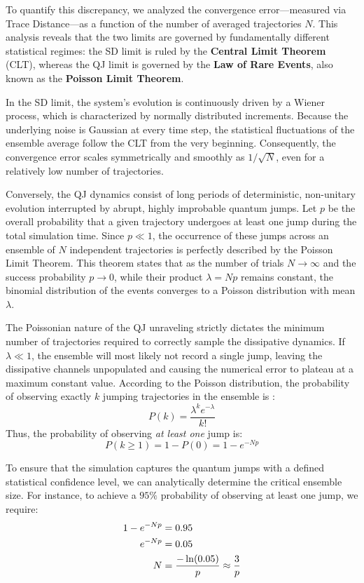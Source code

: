 \documentclass[a4paper,12pt]{article}
\begin{document}
To quantify this discrepancy, we analyzed the convergence error—measured via Trace Distance—as a function of the number of averaged trajectories $N$. This analysis reveals that the two limits are governed by fundamentally different statistical regimes: the SD limit is ruled by the \textbf{Central Limit Theorem} (CLT), whereas the QJ limit is governed by the \textbf{Law of Rare Events}, also known as the \textbf{Poisson Limit Theorem}.

In the SD limit, the system's evolution is continuously driven by a Wiener process, which is characterized by normally distributed increments. Because the underlying noise is Gaussian at every time step, the statistical fluctuations of the ensemble average follow the CLT from the very beginning. Consequently, the convergence error scales symmetrically and smoothly as $1/\sqrt{N}$, even for a relatively low number of trajectories.

Conversely, the QJ dynamics consist of long periods of deterministic, non-unitary evolution interrupted by abrupt, highly improbable quantum jumps. Let $p$ be the overall probability that a given trajectory undergoes at least one jump during the total simulation time. Since $p \ll 1$, the occurrence of these jumps across an ensemble of $N$ independent trajectories is perfectly described by the Poisson Limit Theorem. This theorem states that as the number of trials $N \to \infty$ and the success probability $p \to 0$, while their product $\lambda = Np$ remains constant, the binomial distribution of the events converges to a Poisson distribution with mean $\lambda$.

The Poissonian nature of the QJ unraveling strictly dictates the minimum number of trajectories required to correctly sample the dissipative dynamics. If $\lambda \ll 1$, the ensemble will most likely not record a single jump, leaving the dissipative channels unpopulated and causing the numerical error to plateau at a maximum constant value. According to the Poisson distribution, the probability of observing exactly $k$ jumping trajectories in the ensemble is :
\begin{equation}
	P(k) = \frac{\lambda^k e^{-\lambda}}{k!}
\end{equation}
Thus, the probability of observing \textit{at least one} jump is:
\begin{equation}
	P(k \ge 1) = 1 - P(0) = 1 - e^{-N p}
\end{equation}

To ensure that the simulation captures the quantum jumps with a defined statistical confidence level, we can analytically determine the critical ensemble size. For instance, to achieve a $95\%$ probability of observing at least one jump, we require:
\begin{align}
	1 - e^{-N p} &= 0.95 \notag \\
	e^{-N p} &= 0.05 \notag \\
	N &= \frac{-\ln(0.05)}{p} \approx \frac{3}{p}
	\label{eq:critical_trajectories}
\end{align}
\end{document}
